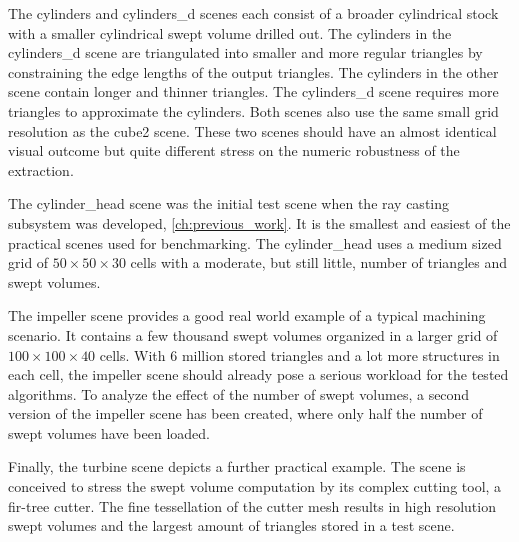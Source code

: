 The cylinders and cylinders\_d scenes each consist of a broader cylindrical stock with a smaller cylindrical swept volume drilled out.
The cylinders in the cylinders\_d scene are triangulated into smaller and more regular triangles by constraining the edge lengths of the output triangles.
The cylinders in the other scene contain longer and thinner triangles.
The cylinders\_d scene requires more triangles to approximate the cylinders.
Both scenes also use the same small grid resolution as the cube2 scene.
These two scenes should have an almost identical visual outcome but quite different stress on the numeric robustness of the extraction.

The cylinder\_head scene was the initial test scene when the ray casting subsystem was developed, \cf \cref{ch:previous_work}.
It is the smallest and easiest of the practical scenes used for benchmarking.
The cylinder\_head uses a medium sized grid of $50\times50\times30$ cells with a moderate, but still little, number of triangles and swept volumes.

The impeller scene provides a good real world example of a typical machining scenario.
It contains a few thousand swept volumes organized in a larger grid of $100\times100\times40$ cells.
With 6 million stored triangles and a lot more structures in each cell, the impeller scene should already pose a serious workload for the tested algorithms.
To analyze the effect of the number of swept volumes, a second version of the impeller scene has been created, where only half the number of swept volumes have been loaded.

Finally, the turbine scene depicts a further practical example.
The scene is conceived to stress the swept volume computation by its complex cutting tool, a fir-tree cutter.
The fine tessellation of the cutter mesh results in high resolution swept volumes and the largest amount of triangles stored in a test scene.

